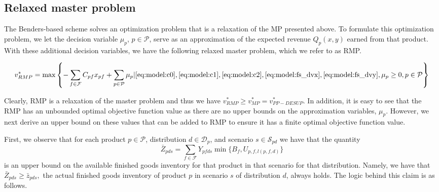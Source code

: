 \documentclass[12pt]{article}
\theoremstyle{thmstylethree}%
\begin{document}
\subsection{Relaxed master problem}
\label{subsec:rmp}
The Benders-based scheme solves an optimization problem that is a relaxation of the MP presented above. To formulate this optimization problem, we let the decision variable $\mu_{p}$, $p \in \mathcal{P}$, serve as an approximation of the expected revenue $Q_{p}(x,y)$ earned from that product. With these additional decision variables, we have the following relaxed master problem, which we refer to as RMP.

\begin{align}
\label{eq:rmpv1}  v^{*}_{RMP} = \max \left\{- \sum_{f \in \mathcal{F}} C_{pf}x_{pf} +  \sum_{p \in \mathcal{P}} \mu_{p} \vert  \eqref{eq:model:c0},\eqref{eq:model:c1},\eqref{eq:model:c2},\eqref{eq:model:fs_dvx},\eqref{eq:model:fs_dvy}, \mu_{p} \geq 0, p \in \mathcal{P}\right\}
\end{align}

Clearly, RMP is a relaxation of the master problem and thus we have $v_{RMP}^{*} \geq v_{MP}^{*}= v_{PP-DESUP}^{*}.$  In addition, it is easy to see that the RMP has an unbounded optimal objective function value as there are no upper bounds on the approximation variables, $\mu_{p}.$  However, we next derive an upper bound on these values that can be added to RMP to ensure it has a finite optimal objective function value. 

First, we observe that for each product $p \in \mathcal{P}$, distribution $d \in \mathcal{D}_{p}$, and scenario $s \in \mathcal{S}_{pd}$ we have that the quantity 
$$\bar{Z}_{pds}=\sum_{f\in\mathcal{F}}Y_{pfds}\min\bigg\{B_f,U_{p,f,l(p,f,d)}\bigg\}$$ 
is an upper bound on the available finished goods inventory for that product in that scenario for that distribution. Namely, we have that $\bar{Z}_{pds} \geq \bar z_{pds},$ the actual finished goods inventory of product $p$ in scenario $s$ of distribution $d$, always holds. The logic behind this claim is as follows. 
\end{document}
